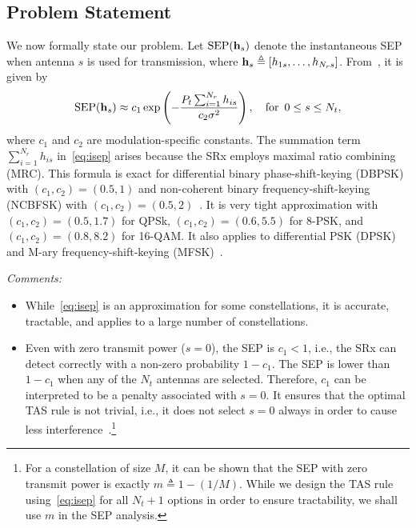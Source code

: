 \documentclass[12pt,draftcls,peerreview,onecolumn]{IEEEtran}
\newcommand{\define}{\triangleq}
\newcommand{\ie}{{i.e.}}
\newcommand{\SEP}{\text{SEP}}
\newcommand{\nx}{{0}}
\newcommand{\Nt}{{N_t}}
\newcommand{\Nr}{{N_r}}
\newcommand{\Pt}{{P_t}}
\newcommand{\such}{h}
\newcommand{\hk}[1]{{\such_{#1}}}
\newcommand{\noisevar}{\sigma^2}
\newcommand{\cone}{c_{1}}
\newcommand{\ctwo}{c_{2}}
\newcommand{\zerosep}{m}
\newcommand{\sumnr}{\sum_{i=1}^{\Nr}}
\begin{document}
\subsection{Problem Statement}
We now formally state our problem. Let $\SEP(\hs)$ denote the instantaneous SEP when antenna $s$ is used for transmission, where $\hs\define\left[\hk{1s},\ldots,\hk{\Nr s} \right]$. From~\cite[(14)]{Chung_2001_TCom}, it is given by  
\begin{equation}
\SEP(\hs) \approx \cone \exp\left({-\frac{\Pt\sumnr\hk{is}}{\ctwo\noisevar} }\right), \quad\text{for} \,\,\, 0\leq s \leq \Nt,
\label{eq:isep}
\end{equation} 
where $\cone$ and $\ctwo$ are modulation-specific constants. The summation term $\sumnr\hk{is}$ in~\eqref{eq:isep} arises because the SRx employs maximal ratio combining (MRC). This formula is exact for differential binary phase-shift-keying (DBPSK) with $(\cone,\ctwo) = (0.5,1)$  and non-coherent binary frequency-shift-keying (NCBFSK) with  $(\cone,\ctwo) = (0.5,2)$~\cite{Fakhan_2014_TSP}. It is very tight approximation with $(\cone,\ctwo )=(0.5,1.7)$ for QPSk,  $(\cone,\ctwo)=(0.6,5.5)$ for 8-PSK, and  $(\cone,\ctwo )=(0.8,8.2)$ for 16-QAM. It also applies to differential PSK (DPSK) and M-ary frequency-shift-keying (MFSK)~\cite{simon_alouini_book}.


{\em Comments:}
\begin{itemize}
\item While~\eqref{eq:isep} is an approximation for some constellations,  it is accurate, tractable, and applies to a large number of constellations. %
\item Even with zero transmit power ($s=\nx$), the SEP is $\cone<1$, \ie, the SRx can detect correctly with a non-zero probability $1-\cone$. The SEP is lower than $1-\cone$ when any of the $\Nt$ antennas are selected. Therefore, $\cone$ can be interpreted to be a penalty associated with $s=\nx$. It ensures that the optimal TAS rule is not trivial, \ie, it does not select $s=\nx$  always in order to cause less interference~\cite{Kashyap_2014_TCOM,Sarvendranath_2013_TCOM}.\footnote{For a constellation of size $M$, it can be shown that the SEP with zero transmit power is exactly $\zerosep\define 1-\left(1/M\right)$. While we design the TAS rule using~\eqref{eq:isep} for all $\Nt+1$ options in order to ensure tractability, we shall use $\zerosep$ in the SEP analysis. } 	
\end{itemize}
\end{document}
